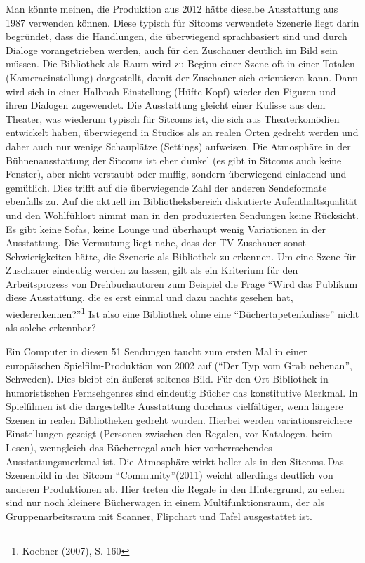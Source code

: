 
Man könnte meinen, die Produktion aus 2012 hätte dieselbe Ausstattung
aus 1987 verwenden können. Diese typisch für Sitcoms verwendete Szenerie
liegt darin begründet, dass die Handlungen, die überwiegend
sprachbasiert sind und durch Dialoge vorangetrieben werden, auch für den
Zuschauer deutlich im Bild sein müssen. Die Bibliothek als Raum wird zu
Beginn einer Szene oft in einer Totalen (Kameraeinstellung) dargestellt,
damit der Zuschauer sich orientieren kann. Dann wird sich in einer
Halbnah-Einstellung (Hüfte-Kopf) wieder den Figuren und ihren Dialogen
zugewendet. Die Ausstattung gleicht einer Kulisse aus dem Theater, was
wiederum typisch für Sitcoms ist, die sich aus Theaterkomödien
entwickelt haben, überwiegend in Studios als an realen Orten gedreht
werden und daher auch nur wenige Schauplätze (Settings)
aufweisen. Die Atmosphäre in der Bühnenausstattung der Sitcoms ist eher
dunkel (es gibt in Sitcoms auch keine Fenster), aber nicht verstaubt
oder muffig, sondern überwiegend einladend und gemütlich. Dies trifft
auf die überwiegende Zahl der anderen Sendeformate ebenfalls zu. Auf die
aktuell im Bibliotheksbereich diskutierte Aufenthaltsqualität und den
Wohlfühlort nimmt man in den produzierten Sendungen keine Rücksicht. Es
gibt keine Sofas, keine Lounge und überhaupt wenig Variationen in der
Ausstattung. Die Vermutung liegt nahe, dass der TV-Zuschauer sonst
Schwierigkeiten hätte, die Szenerie als Bibliothek zu erkennen. Um eine
Szene für Zuschauer eindeutig werden zu lassen, gilt als ein Kriterium
für den Arbeitsprozess von Drehbuchautoren zum Beispiel die Frage
\enquote{Wird das Publikum diese Ausstattung, die es erst einmal und
dazu nachts gesehen hat, wiedererkennen?}\footnote{Koebner (2007), S.
  160} Ist also eine Bibliothek ohne eine \enquote{Büchertapetenkulisse}
nicht als solche erkennbar?

Ein Computer in diesen 51 Sendungen taucht zum ersten Mal in einer
europäischen Spielfilm-Produktion von 2002 auf (\enquote{Der Typ vom
Grab nebenan}, Schweden). Dies bleibt ein äußerst seltenes Bild. Für den
Ort Bibliothek in humoristischen Fernsehgenres sind eindeutig Bücher das
konstitutive Merkmal. In Spielfilmen ist die dargestellte Ausstattung
durchaus vielfältiger, wenn längere Szenen in realen Bibliotheken
gedreht wurden. Hierbei werden variationsreichere Einstellungen gezeigt
(Personen zwischen den Regalen, vor Katalogen, beim Lesen), wenngleich
das Bücherregal auch hier vorherrschendes Ausstattungsmerkmal ist. Die
Atmosphäre wirkt heller als in den Sitcoms.\,Das Szenenbild in der Sitcom
\enquote{Community}(2011) weicht allerdings deutlich von anderen
Produktionen ab. Hier treten die Regale in den Hintergrund, zu sehen
sind nur noch kleinere Bücherwagen in einem Multifunktionsraum, der als
Gruppenarbeitsraum mit Scanner, Flipchart und Tafel ausgestattet ist.


